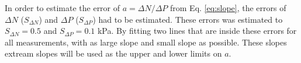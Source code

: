 In order to estimate the error of $a =\Delta N/ \Delta P$ from Eq. \ref{eq:slope}, the errors of $\Delta N$ ($S_{\Delta N}$) and $\Delta P$ ($S_{\Delta P}$) had to be estimated. These errors was estimated to $S_{\Delta N}=0.5$ and $S_{\Delta P}=0.1$ kPa. By fitting two lines that are inside these errors for all measurements, with as large slope and small slope as possible. These slopes extream slopes will be used as the upper and lower limits on $a$.
